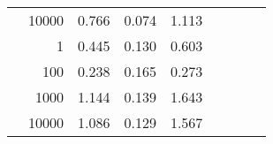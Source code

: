 \begin{table}
\begin{tabular}{rrrrrrrrr}
	            
					 &  
					 
					\multirow{ 1 }{*}{ 10000 } &
					
						
							    
							    
	                           0.766 & 0.074 & 1.113  \\
	                
	            
	        
				\noalign{\smallskip}\hline
				\multirow{ 4 }{*}{ 2000000 } &
				
					
					 
					\multirow{ 1 }{*}{ 1 } &
					
						
							    
							    
	                           0.445 & 0.130 & 0.603  \\
	                
	            
					 &  
					 
					\multirow{ 1 }{*}{ 100 } &
					
						
							    
							    
	                           0.238 & 0.165 & 0.273  \\
	                
	            
					 &  
					 
					\multirow{ 1 }{*}{ 1000 } &
					
						
							    
							    
	                           1.144 & 0.139 & 1.643  \\
	                
	            
					 &  
					 
					\multirow{ 1 }{*}{ 10000 } &
					
						
							    
							    
	                           1.086 & 0.129 & 1.567  \\
	                
	            
	        

\hline

\end{tabular}
\end{table}
\clearpage


	    

